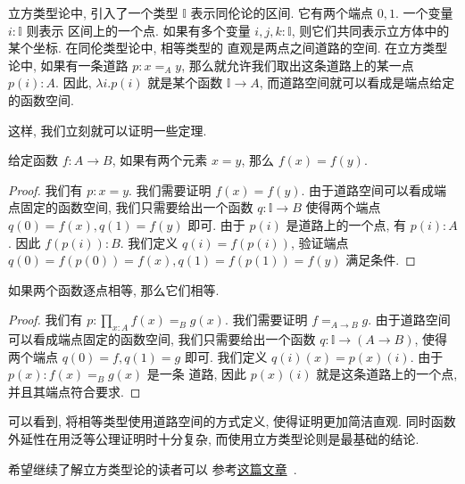 立方类型论中, 引入了一个类型 \(\mathbb I\) 表示同伦论的区间.
它有两个端点 \(0,1\). 一个变量 \(i : \mathbb I\) 则表示
区间上的一个点. 如果有多个变量 \(i,j,k : \mathbb I\),
则它们共同表示立方体中的某个坐标. 在同伦类型论中, 相等类型的
直观是两点之间道路的空间. 在立方类型论中, 如果有一条道路
\(p : x =_A y\), 那么就允许我们取出这条道路上的某一点
\(p(i) : A\). 因此, \(\lambda i. p(i)\) 就是某个函数
\(\mathbb I \to A\), 而道路空间就可以看成是端点给定的函数空间.

这样, 我们立刻就可以证明一些定理.

\begin{theorem}
给定函数 \(f : A \to B\), 如果有两个元素 \(x = y\), 那么
\(f(x) = f(y)\).
\end{theorem}
\begin{proof}
我们有 \(p : x = y\). 我们需要证明 \(f(x) = f(y)\).
由于道路空间可以看成端点固定的函数空间, 我们只需要给出一个函数
\(q : \mathbb I \to B\) 使得两个端点 \(q(0) = f(x),
q(1) = f(y)\) 即可. 由于 \(p(i)\) 是道路上的一个点, 有
\(p(i) : A\). 因此 \(f(p(i)) : B\). 我们定义 \(q(i) = f(p(i))\),
验证端点 \(q(0) = f(p(0)) = f(x), q(1) = f(p(1)) = f(y)\)
满足条件.
\end{proof}

\begin{theorem}
如果两个函数逐点相等, 那么它们相等.
\end{theorem}
\begin{proof}
我们有 \(p : \prod_{x : A} f(x) =_B g(x)\). 我们需要证明
\(f =_{A\to B} g\). 由于道路空间可以看成端点固定的函数空间,
我们只需要给出一个函数 \(q : \mathbb I \to (A \to B)\), 使得
两个端点 \(q(0) = f, q(1) = g\) 即可. 我们定义
\(q(i)(x) = p(x)(i)\). 由于 \(p(x) : f(x) =_B g(x)\) 是一条
道路, 因此 \(p(x)(i)\) 就是这条道路上的一个点, 并且其端点符合要求.
\end{proof}

可以看到, 将相等类型使用道路空间的方式定义, 使得证明更加简洁直观.
同时函数外延性在用泛等公理证明时十分复杂, 而使用立方类型论则是最基础的结论.


希望继续了解立方类型论的读者可以
参考\href{https://1lab.dev/1Lab.intro.html}{这篇文章}~\cite{amelia:2023:1lab}.
